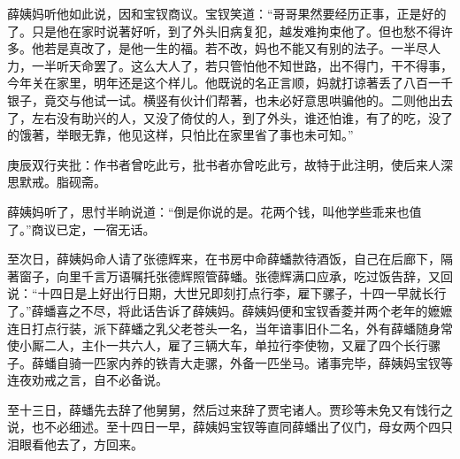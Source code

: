 \begin{parag}


    薛姨妈听他如此说，因和宝钗商议。宝钗笑道：“哥哥果然要经历正事，正是好的了。只是他在家时说著好听，到了外头旧病复犯，越发难拘束他了。但也愁不得许多。他若是真改了，是他一生的福。若不改，妈也不能又有别的法子。一半尽人力，一半听天命罢了。这么大人了，若只管怕他不知世路，出不得门，干不得事，今年关在家里，明年还是这个样儿。他既说的名正言顺，妈就打谅著丢了八百一千银子，竟交与他试一试。横竖有伙计们帮著，也未必好意思哄骗他的。二则他出去了，左右没有助兴的人，又没了倚仗的人，到了外头，谁还怕谁，有了的吃，没了的饿著，举眼无靠，他见这样，只怕比在家里省了事也未可知。”\begin{note}庚辰双行夹批：作书者曾吃此亏，批书者亦曾吃此亏，故特于此注明，使后来人深思默戒。脂砚斋。\end{note}薛姨妈听了，思忖半晌说道：“倒是你说的是。花两个钱，叫他学些乖来也值了。”商议已定，一宿无话。
\end{parag}


\begin{parag}


    至次日，薛姨妈命人请了张德辉来，在书房中命薛蟠款待酒饭，自己在后廊下，隔著窗子，向里千言万语嘱托张德辉照管薛蟠。张德辉满口应承，吃过饭告辞，又回说：“十四日是上好出行日期，大世兄即刻打点行李，雇下骡子，十四一早就长行了。”薛蟠喜之不尽，将此话告诉了薛姨妈。薛姨妈便和宝钗香菱并两个老年的嬷嬷连日打点行装，派下薛蟠之乳父老苍头一名，当年谙事旧仆二名，外有薛蟠随身常使小厮二人，主仆一共六人，雇了三辆大车，单拉行李使物，又雇了四个长行骡子。薛蟠自骑一匹家内养的铁青大走骡，外备一匹坐马。诸事完毕，薛姨妈宝钗等连夜劝戒之言，自不必备说。
\end{parag}


\begin{parag}


    至十三日，薛蟠先去辞了他舅舅，然后过来辞了贾宅诸人。贾珍等未免又有饯行之说，也不必细述。至十四日一早，薛姨妈宝钗等直同薛蟠出了仪门，母女两个四只泪眼看他去了，方回来。
\end{parag}


